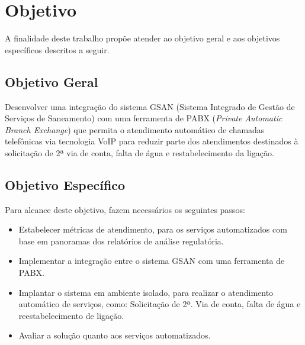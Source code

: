 \section{Objetivo}

A finalidade deste trabalho propõe atender ao objetivo geral e aos objetivos específicos descritos a seguir.

\subsection{Objetivo Geral}

Desenvolver uma integração do sistema GSAN (Sistema Integrado de Gestão de Serviços de Saneamento) com uma ferramenta de PABX (\textit{Private Automatic Branch Exchange}) que permita o atendimento automático de chamadas telefônicas via tecnologia VoIP para reduzir parte dos atendimentos destinados à solicitação de 2ª via de conta, falta de água e restabelecimento da ligação.

\subsection{Objetivo Específico}
Para alcance deste objetivo, fazem necessários os seguintes passos:
\begin{itemize}
	\item Estabelecer métricas de atendimento, para os serviços automatizados com base em panoramas dos relatórios de análise regulatória. 
	\item Implementar a integração entre o sistema GSAN com uma ferramenta de PABX.
	\item Implantar o sistema em ambiente isolado, para realizar o atendimento automático de serviços, como: Solicitação de 2ª. Via de conta, falta de água e reestabelecimento de ligação.
	\item Avaliar a solução quanto aos serviços automatizados.
\end{itemize}